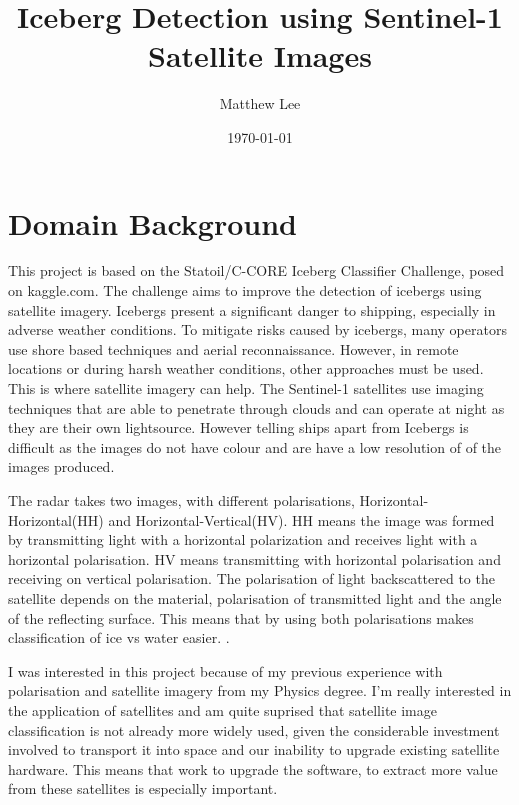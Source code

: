 \documentclass{article}
\begin{document}
\title{Iceberg Detection using Sentinel-1 Satellite Images}
\author{Matthew Lee}
\date{\today}
\maketitle{}
\newpage{}

\section{Domain Background}
This project is based on the Statoil/C-CORE Iceberg Classifier Challenge, posed on kaggle.com. The challenge aims to improve the detection of icebergs using satellite imagery. Icebergs present a significant danger to shipping, especially in adverse weather conditions. To mitigate risks caused by icebergs, many operators use shore based techniques and aerial reconnaissance. However, in remote locations or during harsh weather conditions, other approaches must be used. This is where satellite imagery can help. The Sentinel-1 satellites use imaging techniques that are able to penetrate through clouds and can operate at night as they are their own lightsource. However telling ships apart from Icebergs is difficult as the images do not have colour and are have a low resolution of  of the images produced. 

The radar takes two images, with different polarisations,  Horizontal-Horizontal(HH) and Horizontal-Vertical(HV). HH means the image was formed by transmitting light with a horizontal polarization and receives light with a horizontal polarisation. HV means transmitting with horizontal polarisation and receiving on vertical polarisation. The polarisation of light backscattered to the satellite depends on the material, polarisation of transmitted light and the angle of the reflecting surface. This means that by using both polarisations makes classification of ice vs water easier. \cite{radarsat-mode-selection,yu}. 

I was interested in this project because of my previous experience with polarisation and satellite imagery from my Physics degree. I'm really interested in the application of satellites and am quite suprised that satellite image classification is not already more widely used, given the considerable investment involved to transport it into space and our inability to upgrade existing satellite hardware. This means that work to upgrade the software, to extract more value from these satellites is especially important.  
\end{document}
